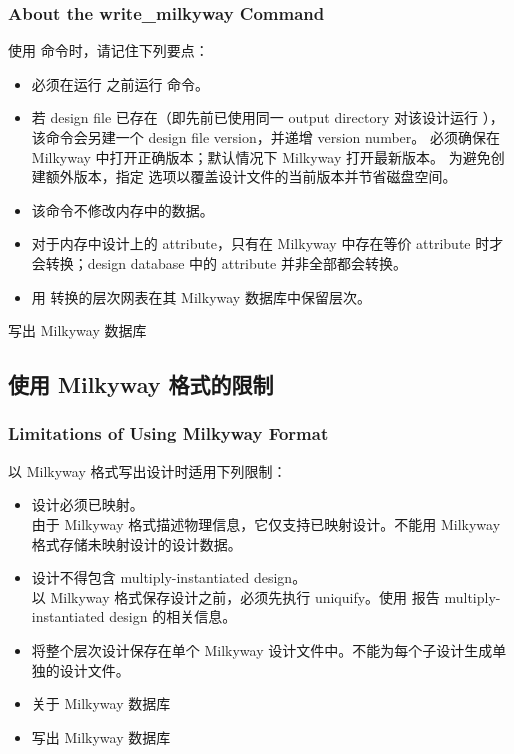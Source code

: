 \subsubsection*{About the write\_milkyway Command}

使用  命令时，请记住下列要点：
\begin{itemize}
  \item 必须在运行  之前运行  命令。
  \item 若 design file 已存在（即先前已使用同一 output directory 对该设计运行 ），该命令会另建一个 design file version，并递增 version number。
        必须确保在 Milkyway 中打开正确版本；默认情况下 Milkyway 打开最新版本。
        为避免创建额外版本，指定  选项以覆盖设计文件的当前版本并节省磁盘空间。
  \item 该命令不修改内存中的数据。
  \item 对于内存中设计上的 attribute，只有在 Milkyway 中存在等价 attribute 时才会转换；design database 中的 attribute 并非全部都会转换。
  \item 用  转换的层次网表在其 Milkyway 数据库中保留层次。
\end{itemize}

\begin{seeAlsoBox}
写出 Milkyway 数据库
\end{seeAlsoBox}

\subsection{使用 Milkyway 格式的限制}
\subsubsection*{Limitations of Using Milkyway Format}

以 Milkyway 格式写出设计时适用下列限制：
\begin{itemize}
  \item 设计必须已映射。\\
        由于 Milkyway 格式描述物理信息，它仅支持已映射设计。不能用 Milkyway 格式存储未映射设计的设计数据。
  \item 设计不得包含 multiply-instantiated design。\\
        以 Milkyway 格式保存设计之前，必须先执行 uniquify。使用  报告 multiply-instantiated design 的相关信息。
  \item {} 将整个层次设计保存在单个 Milkyway 设计文件中。不能为每个子设计生成单独的设计文件。
\end{itemize}

\begin{seeAlsoBox}
\begin{itemize}
  \item 关于 Milkyway 数据库
  \item 写出 Milkyway 数据库
\end{itemize}
\end{seeAlsoBox}
